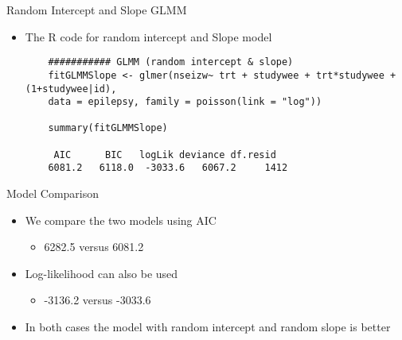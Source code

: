 \documentclass{beamer}
\begin{document}
\begin{frame}[fragile]{Random Intercept and Slope GLMM}
\begin{itemize}
	\item The R code for random intercept and Slope model
	\scriptsize
	\begin{verbatim}
	########### GLMM (random intercept & slope)
	fitGLMMSlope <- glmer(nseizw~ trt + studywee + trt*studywee + (1+studywee|id), 
	data = epilepsy, family = poisson(link = "log"))
	
	summary(fitGLMMSlope)
	
	 AIC      BIC   logLik deviance df.resid 
	6081.2   6118.0  -3033.6   6067.2     1412
	\end{verbatim}
\end{itemize}
\end{frame}

\begin{frame}{Model Comparison}
\begin{itemize}
\item We compare the two models using AIC \vspace{0.25cm}
	\begin{itemize}
		\item 6282.5 versus 6081.2 \vspace{0.25cm}
	\end{itemize}
\item Log-likelihood can also be used \vspace{0.25cm}
\begin{itemize}
	\item -3136.2 versus -3033.6 \vspace{0.25cm}
\end{itemize}
\item In both cases the model with random intercept and random slope is better 
\end{itemize}
\end{frame}
\end{document}
